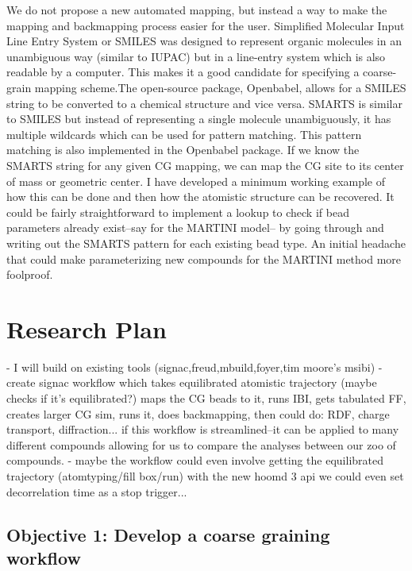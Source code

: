 We do not propose a new automated mapping, but instead a way to make the mapping and backmapping process easier for the user.
Simplified Molecular Input Line Entry System or SMILES was designed to represent organic molecules in an unambiguous way (similar to IUPAC) but in a line-entry system which is also readable by a computer\cite{Weininger1988}.
This makes it a good candidate for specifying a coarse-grain mapping scheme.The open-source package, Openbabel, allows for a SMILES string to be converted to a chemical structure and vice versa.
SMARTS is similar to SMILES but instead of representing a single molecule unambiguously, it has multiple wildcards which can be used for pattern matching.%
This pattern matching is also implemented in the Openbabel package.
If we know the SMARTS string for any given CG mapping, we can map the CG site to its center of mass or geometric center.
I have developed a minimum working example of how this can be done and then how the atomistic structure can be recovered.%
It could be fairly straightforward to implement a lookup to check if bead parameters already exist--say for the MARTINI model-- by going through and writing out the SMARTS pattern for each existing bead type.
An initial headache that could make parameterizing new compounds for the MARTINI method more foolproof.

\section*{Research Plan}

- I will build on existing tools (signac,freud,mbuild,foyer,tim moore's msibi)
- create signac workflow which takes equilibrated atomistic trajectory (maybe checks if it's equilibrated?) maps the CG beads to it, runs IBI, gets tabulated FF, creates larger CG sim, runs it, does backmapping, then could do: RDF, charge transport, diffraction...
if this workflow is streamlined--it can be applied to many different compounds allowing for us to compare the analyses between our zoo of compounds.
- maybe the workflow could even involve getting the equilibrated trajectory (atomtyping/fill box/run) with the new hoomd 3 api we could even set decorrelation time as a stop trigger...

\subsection*{Objective 1: Develop a coarse graining workflow}

